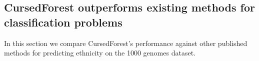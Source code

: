 \documentclass[10pt,a4paper]{article}  %
\newcommand{\cursedforest}{{\sc CursedForest}}
\begin{document}







\subsection{CursedForest outperforms existing methods for classification problems}
In this section we compare \cursedforest 's performance against other published methods for predicting ethnicity on the 1000 genomes dataset.
\end{document}
